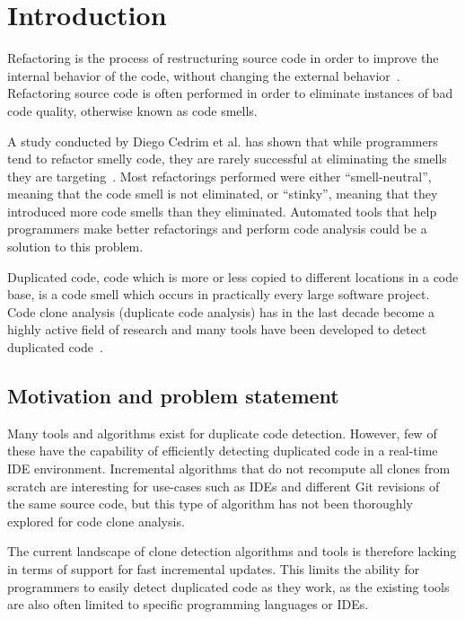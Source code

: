 \chapter{Introduction}

Refactoring is the process of restructuring source code in order to improve the internal
behavior of the code, without changing the external behavior~\cite[9]{fowlerrefactoring}.
Refactoring source code is often performed in order to eliminate instances of bad code
quality, otherwise known as code smells.

A study conducted by Diego Cedrim et al. has shown that while programmers tend to refactor
smelly code, they are rarely successful at eliminating the smells they are
targeting~\cite{Rohit_Gheyi_Impact}. Most refactorings performed were either
``smell-neutral'', meaning that the code smell is not eliminated, or ``stinky'',
meaning that they introduced more code smells than they eliminated. Automated tools that
help programmers make better refactorings and perform code analysis could be a solution to
this problem.

Duplicated code, code which is more or less copied to different locations in a code base,
is a code smell which occurs in practically every large software project. Code clone
analysis (duplicate code analysis) has in the last decade become a highly active field of
research and many tools have been developed to detect duplicated
code~\cite[6]{Inoue_introduction_to_cc}. 

\section{Motivation and problem statement}

Many tools and algorithms exist for duplicate code detection. However, few of these have
the capability of efficiently detecting duplicated code in a real-time IDE environment.
Incremental algorithms that do not recompute all clones from scratch are interesting for
use-cases such as IDEs and different Git revisions of the same source code, but this type of
algorithm has not been thoroughly explored for code clone analysis.

The current landscape of clone detection algorithms and tools is therefore lacking in
terms of support for fast incremental updates. This limits the ability for programmers to
easily detect duplicated code as they work, as the existing tools are also often limited
to specific programming languages or IDEs.

